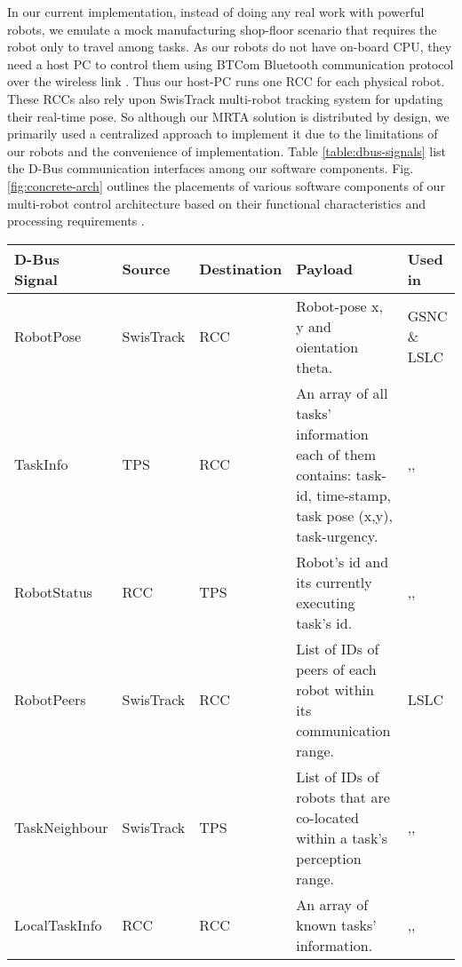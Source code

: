 \documentclass[journal]{IEEEtran}
\begin{document}
\begin{figure*}
\centering
\hspace*{1cm}
\newline
{}
\caption{Our experiment arena captured by (a) a GigE4900C camera mounted on 3m high ceiling (b) an ordinary camcorder.}
\label{fig:expt-arena} %
\end{figure*}
In our current implementation, instead of doing any real work with powerful robots, we emulate a mock manufacturing shop-floor scenario that requires the robot only to travel among tasks. As our robots do not have on-board CPU, they need a host PC to  control them using BTCom Bluetooth communication protocol over the wireless link \cite{Mondada+2009}. Thus our host-PC runs one RCC for each physical robot. These RCCs also rely upon SwisTrack multi-robot tracking system for updating their real-time pose. So although our MRTA solution is distributed by design, we primarily used a centralized approach to implement it due to the limitations of our robots and the convenience of implementation. Table \ref{table:dbus-signals} list the D-Bus communication interfaces among our software components. Fig. \ref{fig:concrete-arch} outlines the placements of various software components of our multi-robot control architecture based on their functional characteristics and processing requirements \cite{Sarker2010control}.
\begin{table*}
\caption{D-Bus signal interfaces among software components.}
\label{table:dbus-signals}
\begin{center}
\begin{tabular}{|l|l|l|p{1.8in}|p{0.5in}|}
\hline D-Bus Signal &  Source & Destination  & Payload & Used in\\ 
\hline RobotPose & SwisTrack & RCC  & Robot-pose x, y and oientation theta. & GSNC \& LSLC\\ 
\hline TaskInfo & TPS & RCC & An array of all tasks' information each of them contains: task-id, time-stamp, task pose (x,y), task-urgency. & ,, \\ 
\hline RobotStatus & RCC & TPS & Robot's id and its currently executing task's id. & ,, \\ 
\hline RobotPeers & SwisTrack & RCC & List of IDs of peers of each robot within its communication range. & LSLC \\ 
\hline TaskNeighbour & SwisTrack & TPS &  List of IDs of robots that are co-located within a task's perception range. & ,,\\ 
\hline LocalTaskInfo & RCC & RCC & An array of known tasks' information. & ,,\\
\hline 
\end{tabular}
\end{center} 
\end{table*}
\end{document}
